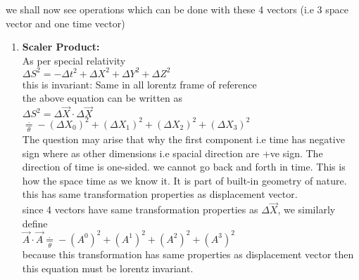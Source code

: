 \documentclass[11pt,a4paper]{article}
\begin{document}
\begin{enumerate}
\begin{enumerate}
                        we shall now see operations which can be done with these 4 vectors (i.e 3 space vector and one time vector)
                        \begin{enumerate}
                              \item \textbf{Scaler Product:}\\
                                    As per special relativity\\
                                    $\Delta{S^2}=-\Delta{t^2}+\Delta{X^2}+\Delta{Y^2}+\Delta{Z^2}$\\
                                    this is invariant: Same in all lorentz frame of reference\\
                                    the above equation can be written as\\
                                    $\Delta{S^2} = \Delta \vec{X} \cdot \Delta\vec{X}$\\
                                    $\mathop = \limits^{.}_{\theta}  -(\Delta{X_0})^2+(\Delta{X_1})^2+(\Delta{X_2})^2+(\Delta{X_3})^2$\\
                                    The question may arise that why the first component i.e time has negative sign where as other dimensions i.e spacial direction are +ve sign. The direction of time is one-sided. we cannot go back and forth in time. This is how the space time as we know it. It is part of built-in geometry of nature.\\
                                    this has same transformation properties as displacement vector.\\
                                    since 4 vectors have same transformation properties as $\Delta \vec{X}$, we similarly define\\
                                    $\vec{A}\cdot\vec{A} \mathop = \limits^{.}_{\theta} - (A^0)^2 + (A^1)^2+ (A^2)^2+ (A^3)^2$\\
                                    because this transformation has same properties as displacement vector then this equation must be lorentz invariant.


\end{enumerate}
\end{enumerate}
\end{enumerate}
\end{document}
